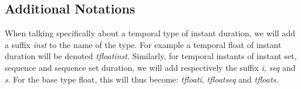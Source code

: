 \subsection{Additional Notations}
\label{section:mobilitydb_notations}

When talking specifically about a temporal type of instant duration, we will add a suffix \textit{inst} to the name of the type. For example a temporal float of instant duration will be denoted \textit{tfloatinst}. 
Similarly, for temporal instants of instant set, sequence and sequence set duration, we will add respectively the suffix \textit{i}, \textit{seq} and \textit{s}. For the base type float, this will thus become: \textit{tfloati}, \textit{tfloatseq} and \textit{tfloats}.